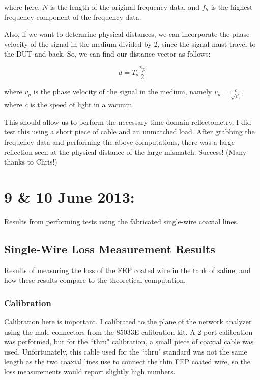 \documentclass[12pt,onecolumn,titlepage]{article}
\begin{document}
where here, $N$ is the length of the original frequency data, and $f_h$ is the highest frequency component of the frequency data. 

Also, if we want to determine physical distances, we can incorporate the phase velocity of the signal in the medium divided by 2, since the signal must travel to the DUT and back. So, we can find our distance vector as follows:

\[ d = T_s \frac{v_p}{2} \]

where $v_p$ is the phase velocity of the signal in the medium, namely $v_p = \frac{c}{\sqrt{\epsilon'_r}}$, where $c$ is the speed of light in a vacuum. 

This should allow us to perform the necessary time domain reflectometry. I did test this using a short piece of cable and an unmatched load. After grabbing the frequency data and performing the above computations, there was a large reflection seen at the physical distance of the large mismatch. Success! (Many thanks to Chris!)





\clearpage
\section{9 \& 10 June 2013:}

\indent \indent Results from performing tests using the fabricated single-wire coaxial lines.

\subsection{Single-Wire Loss Measurement Results}
\indent \indent Results of measuring the loss of the FEP coated wire in the tank of saline, and how these results compare to the theoretical computation.

\subsubsection{Calibration}
\indent \indent Calibration here is important. I calibrated to the plane of the network analyzer using the male connectors from the 85033E calibration kit. A 2-port calibration was performed, but for the ``thru" calibration, a small piece of coaxial cable was used. Unfortunately, this cable used for the ``thru" standard was not the same length as the two coaxial lines use to connect the thin FEP coated wire, so the loss measurements would report slightly high numbers.
\end{document}
